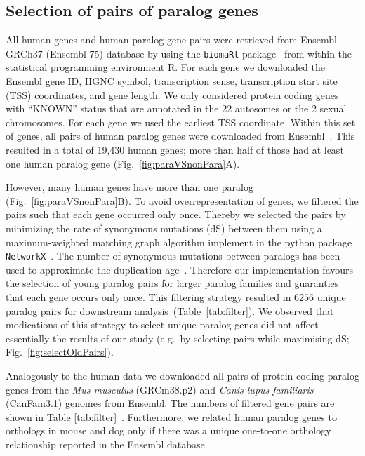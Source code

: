 \documentclass[a4paper,twoside=true,openright,parskip=full,chapterprefix=true,11pt,headings=normal,bibliography=totoc,listof=totoc,titlepage=on,captions=tableabove,draft=false]{scrreprt}
\theoremstyle{definition}
\theoremstyle{definition}
\theoremstyle{definition}
\theoremstyle{remark}
\begin{document}
\hypertarget{selection-of-pairs-of-paralog-genes}{%
\subsection{Selection of pairs of paralog
genes}\label{selection-of-pairs-of-paralog-genes}}

All human genes and human paralog gene pairs were retrieved from Ensembl
GRCh37 (Ensembl 75) database by using the \texttt{biomaRt}
package~\citep{Durinck2009b, Durinck2005} from within the statistical
programming environment R. For each gene we downloaded the Ensembl gene
ID, HGNC symbol, transcription sense, transcription start site (TSS)
coordinates, and gene length. We only considered protein coding genes
with ``KNOWN'' status that are annotated in the 22 autosomes or the 2
sexual chromosomes. For each gene we used the earliest TSS coordinate.
Within this set of genes, all pairs of human paralog genes were
downloaded from Ensembl~\citep{Vilella2009}. This resulted in a total of
19,430 human genes; more than half of those had at least one human
paralog gene (Fig.~\ref{fig:paraVSnonPara}A).

However, many human genes have more than one paralog
(Fig.~\ref{fig:paraVSnonPara}B). To avoid overrepresentation of genes,
we filtered the pairs such that each gene occurred only once. Thereby we
selected the pairs by minimizing the rate of synonymous mutations (dS)
between them using a maximum-weighted matching graph algorithm implement
in the python package \texttt{NetworkX}~\citep{Galil1986}. The number of
synonymous mutations between paralogs has been used to approximate the
duplication age~\citep{Lan2016}. Therefore our implementation favours
the selection of young paralog pairs for larger paralog families and
guaranties that each gene occurs only once. This filtering strategy
resulted in \(6256\) unique paralog pairs for downstream
analysis~(Table~\ref{tab:filter}). We observed that modications of this
strategy to select unique paralog genes did not affect essentially the
results of our study (e.g.~by selecting pairs while maximising dS;
Fig.~\ref{fig:selectOldPairs}).

Analogously to the human data we downloaded all pairs of protein coding
paralog genes from the \emph{Mus musculus} (GRCm38.p2) and \emph{Canis
lupus familiaris} (CanFam3.1) genomes from Ensembl. The numbers of
filtered gene pairs are shown in Table \ref{tab:filter}~. Furthermore,
we related human paralog genes to orthologs in mouse and dog only if
there was a unique one-to-one orthology relationship reported in the
Ensembl database.
\end{document}
